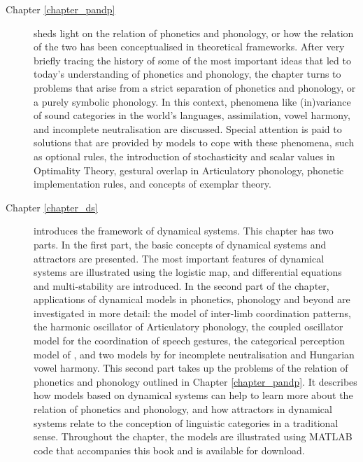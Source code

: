 \begin{description}

\item[Chapter \ref{chapter_pandp}] sheds light on the relation of phonetics and phonology, or how the relation of the two has been conceptualised in theoretical frameworks. After very briefly tracing the history of some of the most important ideas that led to today's understanding of phonetics and phonology, the chapter turns to problems that arise from a strict separation of phonetics and phonology, or a purely symbolic phonology. In this context, phenomena like (in)variance of sound categories in the world's languages, assimilation, vowel harmony, and incomplete neutralisation are discussed. Special attention is paid to solutions that are provided by models to cope with these phenomena, such as optional rules, the introduction of stochasticity and scalar values in Optimality Theory, gestural overlap in Articulatory phonology, phonetic implementation rules, and concepts of exemplar theory. 

\item[Chapter \ref{chapter_ds}] introduces the framework of dynamical systems. This chapter has two parts. In the first part, the basic concepts of dynamical systems and attractors are presented. The most important features of dynamical systems are illustrated using the logistic map, and differential equations and multi-stability are introduced. In the second part of the chapter, applications of dynamical models in phonetics, phonology and beyond are investigated in more detail: the \citet{HakenKelsoBunz1985} model of inter-limb coordination patterns, the harmonic oscillator of Articulatory phonology, the coupled oscillator model for the coordination of speech gestures, the categorical perception model of \cite{Tulleretal1994}, and two models by \citet{GafosBenus2006} for incomplete neutralisation and Hungarian vowel harmony. This second part takes up the problems of the relation of phonetics and phonology outlined in Chapter \ref{chapter_pandp}. It describes how models based on dynamical systems can help to learn more about the relation of phonetics and phonology, and how attractors in dynamical systems relate to the conception of linguistic categories in a traditional sense. Throughout the chapter, the models are illustrated using MATLAB code that accompanies this book and is available for download.


\end{description}
